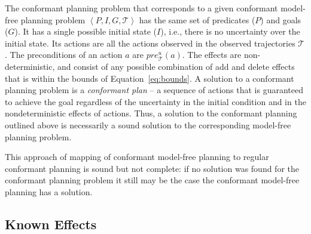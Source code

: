 \documentclass[letterpaper]{article}
\newcommand{\tuple}[1]{\ensuremath{\left \langle #1 \right \rangle }}
\begin{document}
The conformant planning problem that corresponds to a given conformant model-free planning problem $\tuple{P,I,G, \mathcal{T}}$ has the same set of predicates ($P$) and goals ($G$). It has a single possible initial state ($I$), i.e., there is no uncertainty over the initial state. Its actions are all the actions observed in the observed trajectories $\mathcal{T}$. The preconditions of an action $a$ are $pre_\mathcal{T}^u(a)$. The effects are non-deterministic, and consist of any possible combination of 
add and delete effects that is within the bounds of Equation~\ref{eq:bounds}. A solution to a conformant planning problem is a {\em conformant plan} -- a sequence of actions that is guaranteed to achieve the goal regardless of the uncertainty in the initial condition and in the nondeterministic effects of actions. Thus, a solution to the conformant planning outlined above is necessarily a sound solution to the corresponding model-free planning problem. 


This approach of mapping of conformant model-free planning to regular  conformant planning is sound but not complete: if no solution was found for the conformant planning problem it still may be the case the conformant model-free planning has a solution. 

\subsection{Known Effects}
\end{document}
